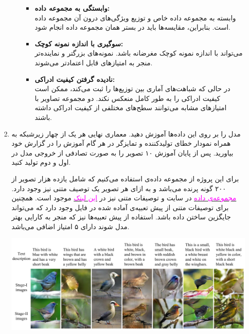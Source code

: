 \begin{enumerate}
\begin{qsolve}
\begin{enumerate}
\begin{itemize}
			\item \textbf{وابستگی به مجموعه داده:}\\
			 وابسته به مجموعه داده خاص و توزیع ویژگی‌های درون آن مجموعه داده است. بنابراین، مقایسه‌ها باید در بستر همان مجموعه داده انجام شود.
			
			
			\item \textbf{سوگیری با اندازه نمونه کوچک:}\\
			 می‌تواند با اندازه نمونه کوچک مغرضانه باشد. نمونه‌های بزرگتر و نماینده‌تر منجر به امتیازهای قابل اعتمادتر می‌شوند.
			
			
			\item \textbf{نادیده گرفتن کیفیت ادراکی:}\\
در حالی که  شباهت‌های آماری بین توزیع‌ها را ثبت می‌کند، ممکن است کیفیت ادراکی را به طور کامل منعکس نکند. دو مجموعه تصاویر با امتیازهای  مشابه می‌توانند سطح‌های مختلفی از کیفیت ادراکی داشته باشند.
		\end{itemize}
		
	\end{enumerate}
	\end{qsolve}



	
	
	
	
	
	\item 
مدل را بر روی این داده‌ها آموزش دهید. معماری نهایی هر یک از چهار زیرشبکه به همراه نمودار خطای تولیدکننده و تمایزگر در هر گام آموزش را در گزارش خود بیاورید. پس از پایان آموزش ۱۰ تصویر را به صورت تصادفی از خروجی مدل در  اول و دوم تولید کنید.
	
	
برای این پروژه از مجموعه داده‌ی  استفاده می‌کنیم که شامل یازده هزار تصویر از ۲۰۰ گونه پرنده می‌باشد و به ازای هر تصویر یک توصیف متنی نیز وجود دارد. \href{https://www.kaggle.com/datasets/veeralakrishna/200-bird-species-with-11788-images}{\textcolor{magenta}{مجموعه‌ی داده}} در سایت  و توصیفات متنی نیز در \href{https://drive.google.com/file/d/0B3y_msrWZaXLT1BZdVdycDY5TEE/view?resourcekey=0-sZrhftoEfdvHq6MweAeCjA}{\textcolor{magenta}{این لینک}} موجود است. همچنین برای توصیفات متنی از پیش تعبیه‌ی آماده شده در فایل  وجود دارد که می‌تواند جایگزین ساختن داده باشد. استفاده از پیش تعبیه‌ها نیز که منجر به کارایی بهتر مدل شوند دارای ۵ امتیاز اضافی می‌باشد.
	
	\begin{center}
		\includegraphics*[width=0.9\linewidth]{pics/img2.png}
		\label{نمونه خروجی مدل StackGAN برای مجموعه داده CUB}
	\end{center}
	

\end{enumerate}
